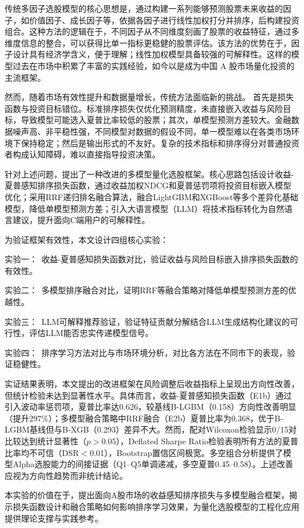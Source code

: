 \documentclass[11pt,a4paper]{ctexart}
\begin{document}
传统多因子选股模型的核心思想是，通过构建一系列能够预测股票未来收益的因子，如价值因子、成长因子等，依据各因子进行线性加权打分并排序，后构建投资组合。这种方法的逻辑在于，不同因子从不同维度刻画了股票的收益特征，通过多维度信息的整合，可以获得比单一指标更稳健的股票评估。该方法的优势在于，因子设计具有经济学含义，便于理解；线性加权模型具备较强的可解释性。这样的模型过去在市场中积累了丰富的实践经验，如今以是成为中国 A 股市场量化投资的主流框架。

然而，随着市场有效性提升和数据量增长，传统方法面临新的挑战。 首先是损失函数与投资目标错位。标准排序损失仅优化预测精度，未直接嵌入收益与风险目标，导致模型可能选入夏普比率较低的股票；其次，单模型预测方差较大。金融数据噪声高、非平稳性强，不同模型对数据的假设不同，单一模型难以在各类市场环境下保持稳定；然后是输出形式的不友好。复杂的技术指标和排序得分对普通投资者构成认知障碍，难以直接指导投资决策。

针对上述问题，提出了一种改进的多模型量化选股框架。核心思路包括设计收益-夏普感知排序损失函数，通过收益加权NDCG和夏普惩罚项将投资目标嵌入模型优化；采用RRF递归排名融合算法，融合LightGBM和XGBoost等多个差异化基础模型，降低单模型预测方差；引入大语言模型（LLM）将技术指标转化为自然语言建议，提升面向C端用户的可解释性。

为验证框架有效性，本文设计四组核心实验：

实验一：\ 收益-夏普感知损失函数对比，验证收益与风险目标嵌入排序损失函数的有效性。

实验二：\ 多模型排序融合对比，证明RRF等融合策略对降低单模型预测方差的优越性。

实验三：\ LLM可解释推荐验证，验证特征贡献分解结合LLM生成结构化建议的可行性，评估LLM能否忠实传递模型信号。

实验四：\ 排序学习方法对比与市场环境分析，对比各方法在不同市下的表现，验证稳健性。

实证结果表明，本文提出的改进框架在风险调整后收益指标上呈现出方向性改善，但统计检验未达到显著性水平。具体而言，收益-夏普感知损失函数（E1b）通过引入波动率惩罚项，夏普比率达0.626，较基线B-LGBM（0.158）方向性改善明显（提升297\%）；多模型融合策略中RRF融合（E2b）夏普比率为0.368，优于B-LGBM基线但与B-XGB（0.293）差异不大。然而，配对Wilcoxon检验显示0/15对比较达到统计显著性（$p>0.05$），Deflated Sharpe Ratio检验表明所有方法的夏普比率均不可信（DSR$<$0.01），Bootstrap置信区间极宽。多空组合分析提供了模型Alpha选股能力的间接证据（Q1--Q5单调递减，多空夏普0.45--0.58）。上述改善应视为方向性趋势而非统计结论。

本实验的价值在于，提出面向A股市场的收益感知排序损失与多模型融合框架，揭示损失函数设计和融合策略如何影响排序学习效果，为量化选股模型的工程化应用提供理论支撑与实践参考。
\end{document}
